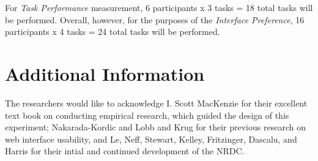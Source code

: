 \documentclass{article}
\begin{document}
For \emph{Task Performance} measurement, 6 participants x 3 tasks = 18 total tasks will be performed. Overall, however, for the purposes of the \emph{Interface Preference}, 16 participants x 4 tasks = 24 total tasks will be performed.

%
%
\section{Additional Information}
The researchers would like to acknowledge I. Scott MacKenzie\cite{hci-research-perspective} for their excellent text book on conducting empirical research, which guided the design of this experiment; Nakarada-Kordic and Lobb\cite{PerceivedAttractiveness} and Krug\cite{dontmakemethink} for their previous research on web interface usability, and Le, Neff, Stewart, Kelley, Fritzinger, Dascalu, and Harris\cite{microservice-nrdc} for their intial and continued development of the NRDC.

%
%



% 
%
%

\printbibliography
\end{document}
